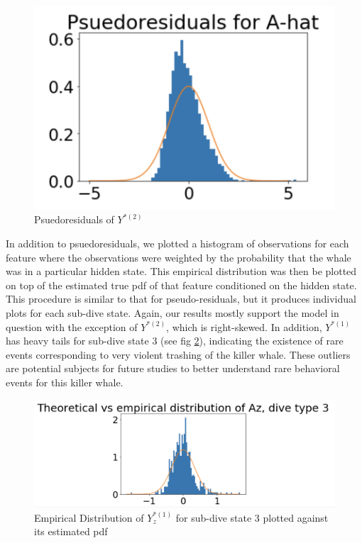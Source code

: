 \begin{figure}[h!]
	\centering
	\includegraphics[width=5.5in]{../Plots/pseudoresids.png}
	\caption{Psuedoresiduals of $Y^{*(2)}$}
	\label{fig:pseudoresids}
\end{figure}

In addition to psuedoresiduals, we plotted a histogram of observations for each feature where the observations were weighted by the probability that the whale was in a particular hidden state. This empirical distribution was then be plotted on top of the estimated true pdf of that feature conditioned on the hidden state. This procedure is similar to that for pseudo-residuals, but it produces individual plots for each sub-dive state. Again, our results mostly support the model in question with the exception of $Y^{*(2)}$, which is right-skewed. In addition, $Y^{*(1)}$ has heavy tails for sub-dive state 3 (see fig \ref{fig:empirical_dist}), indicating the existence of rare events corresponding to very violent trashing of the killer whale. These outliers are potential subjects for future studies to better understand rare behavioral events for this killer whale.

\begin{figure}[h!]
	\centering
	\includegraphics[width=5.5in]{../Plots/empirical_dist.png}
	\caption{Empirical Distribution of $Y^{*(1)}_z$ for sub-dive state 3 plotted against its estimated pdf}
	\label{fig:empirical_dist}
\end{figure}
